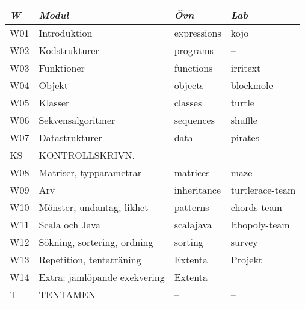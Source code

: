 \begin{tabular}{l|l|l|l}
\textit{W} & \textit{Modul} & \textit{Övn} & \textit{Lab} \\ \hline \hline
W01 & Introduktion & expressions & kojo \\
W02 & Kodstrukturer & programs & -- \\
W03 & Funktioner & functions & irritext \\
W04 & Objekt & objects & blockmole \\
W05 & Klasser & classes & turtle \\
W06 & Sekvensalgoritmer & sequences & shuffle \\
W07 & Datastrukturer & data & pirates \\
KS & KONTROLLSKRIVN. & -- & -- \\
W08 & Matriser, typparametrar & matrices & maze \\
W09 & Arv & inheritance & turtlerace-team \\
W10 & Mönster, undantag, likhet & patterns & chords-team \\
W11 & Scala och Java & scalajava & lthopoly-team \\
W12 & Sökning, sortering, ordning & sorting & survey \\
W13 & Repetition, tentaträning & Extenta & Projekt \\
W14 & Extra: jämlöpande exekvering & Extenta & -- \\
T & TENTAMEN & -- & -- \\
\end{tabular}
